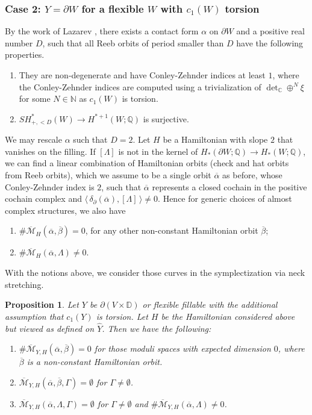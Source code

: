 \documentclass[reqno,11pt]{amsart}
\numberwithin{equation}{section}
\newtheorem{proposition}[theorem]{\textbf{Proposition}}
\def\N{{\mathbb N}}
\def\C{{\mathbb C}}
\def\D{{\mathbb D}}
\def\Q{{\mathbb Q}}
\def\cM{{\mathcal M}}
\def\la{\langle\,}
\def\ra{\,\rangle}
\begin{document}
\subsubsection{Case 2: $Y=\partial W$ for a flexible $W$ with $c_1(W)$ torsion}
By the work of Lazarev \cite{zbMATH07184228}, there exists a contact form $\alpha$ on $\partial W$ and a positive real number $D$, such that all Reeb orbits of period smaller than $D$ have the following properties.
\begin{enumerate}
	\item They are non-degenerate and have Conley-Zehnder indices at least $1$, where the Conley-Zehnder indices are computed using a trivialization of $\det_{\C} \oplus^N\xi$ for some $N\in \N$ as $c_1(W)$ is torsion.
	\item $SH^*_{+,<D}(W)\to H^{*+1}(W;\Q)$ is surjective. 
\end{enumerate}	
We may rescale $\alpha$ such that $D=2$. Let $H$ be a Hamiltonian with slope $2$ that vanishes on the filling. If $[\Lambda]$ is not in the kernel of $H_*(\partial W;\Q)\to H_*(W;\Q)$, we can find a linear combination of Hamiltonian orbits (check and hat orbits from Reeb orbits), which we assume to be a single orbit $\overline{\alpha}$ as before, whose Conley-Zehnder index is $2$, such that $\overline{\alpha}$ represents a closed cochain in the positive cochain complex and $\la \delta_{\partial}(\overline{\alpha}),[\Lambda]\ra \ne 0$. Hence for generic choices of almost complex structures, we also have
\begin{enumerate}
	\item $\#\overline{\cM}_H(\overline{\alpha},\overline{\beta})=0$, for any other non-constant Hamiltonian orbit $\overline{\beta}$;
	\item $\#\overline{\cM}_H(\overline{\alpha},\Lambda) \ne 0$.
\end{enumerate}	 
With the notions above, we consider those curves in the symplectization via neck stretching.
\begin{proposition}\label{prop:curve}
Let $Y$ be $\partial(V\times \D)$ or flexible fillable with the additional assumption that $c_1(Y)$ is torsion. Let $H$ be the Hamiltonian considered above but viewed as defined on $\widehat{Y}$. Then we have the following:
\begin{enumerate}
    \item\label{m2} $\#\overline{\cM}_{Y,H}(\overline{\alpha},\overline{\beta})=0$ for those moduli spaces with expected dimension $0$, where $\overline{\beta}$ is a non-constant Hamiltonian orbit. 
    \item\label{m1} $\overline{\cM}_{Y,H}(\overline{\alpha},\overline{\beta},\Gamma)=\emptyset$ for $\Gamma\ne \emptyset$. 
    \item\label{m3} $\overline{\cM}_{Y,H}(\overline{\alpha},\Lambda,\Gamma)=\emptyset$ for $\Gamma \ne \emptyset$ and $\#\overline{\cM}_{Y,H}(\overline{\alpha},\Lambda) \ne 0$.
\end{enumerate}
\end{proposition}
\end{document}
